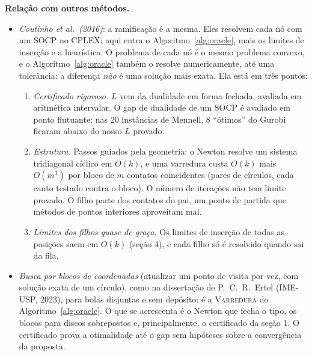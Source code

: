 \documentclass[11pt]{article}
\theoremstyle{plain}
\theoremstyle{remark}
\newcommand{\sect}[1]{\par\bigskip{\color{navy}\large\bfseries #1\par}\smallskip}
\begin{document}
\textbf{Relação com outros métodos.}
\begin{itemize}
  \item \emph{Coutinho et al.~(2016)}: a ramificação é a mesma. Eles resolvem cada nó com um
    SOCP no CPLEX; aqui entra o Algoritmo~\ref{alg:oracle}, mais os limites de inserção e a
    heurística. O problema de cada nó é o mesmo problema convexo, e o Algoritmo~\ref{alg:oracle}
    também o resolve numericamente, até uma tolerância: a diferença \emph{não} é uma solução
    mais exata. Ela está em três pontos:
    \begin{enumerate}[label=(\roman*)]
      \item \emph{Certificado rigoroso.} $L$ vem da dualidade em forma fechada, avaliada em
        aritmética intervalar. O gap de dualidade de um SOCP é avaliado em ponto flutuante:
        nas 20 instâncias de Mennell, 8 ``ótimos'' do Gurobi ficaram abaixo do nosso $L$
        provado.
      \item \emph{Estrutura.} Passos guiados pela geometria: o Newton resolve um sistema
        tridiagonal cíclico em $O(k)$, e uma varredura custa $O(k)$ mais $O(m^3)$ por bloco de
        $m$ contatos coincidentes (pares de círculos, cada canto testado contra o bloco). O
        número de iterações não tem limite provado. O filho parte dos contatos do pai, um
        ponto de partida que métodos de pontos interiores aproveitam mal.
      \item \emph{Limites dos filhos quase de graça.} Os limites de inserção de todas as
        posições saem em $O(k)$ (seção 4), e cada filho só é resolvido quando sai da fila.
    \end{enumerate}
  \item \emph{Busca por blocos de coordenadas} (atualizar um ponto de visita por vez, com
    solução exata de um círculo), como na dissertação de P.~C.~R.~Ertel (IME-USP, 2023), para
    bolas disjuntas e sem depósito: é a \textsc{Varredura} do Algoritmo~\ref{alg:oracle}. O
    que se acrescenta é o Newton que fecha o tipo, os blocos para discos sobrepostos e,
    principalmente, o certificado da seção 1. O certificado prova a otimalidade até o gap
    sem hipóteses sobre a convergência da proposta.
\end{itemize}

\sect{6. Resultados}
\end{document}
